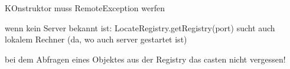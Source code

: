 KOnstruktor muss RemoteException werfen

wenn kein Server bekannt ist: LocateRegistry.getRegistry(port) sucht auch lokalem Rechner (da, wo auch server gestartet ist)

bei dem Abfragen eines Objektes aus der Registry das casten  nicht vergessen!
